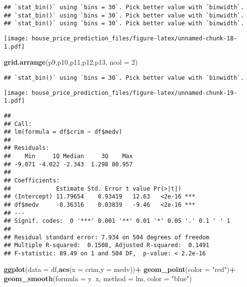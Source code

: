 \documentclass[
]{article}
\newenvironment{Shaded}{\begin{snugshade}}{\end{snugshade}}
\newcommand{\DataTypeTok}[1]{\textcolor[rgb]{0.13,0.29,0.53}{#1}}
\newcommand{\DecValTok}[1]{\textcolor[rgb]{0.00,0.00,0.81}{#1}}
\newcommand{\KeywordTok}[1]{\textcolor[rgb]{0.13,0.29,0.53}{\textbf{#1}}}
\newcommand{\NormalTok}[1]{#1}
\newcommand{\OperatorTok}[1]{\textcolor[rgb]{0.81,0.36,0.00}{\textbf{#1}}}
\newcommand{\StringTok}[1]{\textcolor[rgb]{0.31,0.60,0.02}{#1}}
\begin{document}
\begin{verbatim}
## `stat_bin()` using `bins = 30`. Pick better value with `binwidth`.
## `stat_bin()` using `bins = 30`. Pick better value with `binwidth`.
## `stat_bin()` using `bins = 30`. Pick better value with `binwidth`.
\end{verbatim}

\texttt{[image: house\_price\_prediction\_files/figure-latex/unnamed-chunk-18-1.pdf]}

\begin{Shaded}
\begin{Highlighting}[]
\KeywordTok{grid.arrange}\NormalTok{(p9,p10,p11,p12,p13, }\DataTypeTok{ncol =} \DecValTok{2}\NormalTok{)}
\end{Highlighting}
\end{Shaded}

\begin{verbatim}
## `stat_bin()` using `bins = 30`. Pick better value with `binwidth`.
\end{verbatim}

\texttt{[image: house\_price\_prediction\_files/figure-latex/unnamed-chunk-19-1.pdf]}

\begin{Shaded}
\end{Shaded}

\begin{verbatim}
## 
## Call:
## lm(formula = df$crim ~ df$medv)
## 
## Residuals:
##    Min     1Q Median     3Q    Max 
## -9.071 -4.022 -2.343  1.298 80.957 
## 
## Coefficients:
##             Estimate Std. Error t value Pr(>|t|)    
## (Intercept) 11.79654    0.93419   12.63   <2e-16 ***
## df$medv     -0.36316    0.03839   -9.46   <2e-16 ***
## ---
## Signif. codes:  0 '***' 0.001 '**' 0.01 '*' 0.05 '.' 0.1 ' ' 1
## 
## Residual standard error: 7.934 on 504 degrees of freedom
## Multiple R-squared:  0.1508, Adjusted R-squared:  0.1491 
## F-statistic: 89.49 on 1 and 504 DF,  p-value: < 2.2e-16
\end{verbatim}

\begin{Shaded}
\begin{Highlighting}[]
\KeywordTok{ggplot}\NormalTok{(}\DataTypeTok{data =}\NormalTok{ df,}\KeywordTok{aes}\NormalTok{(}\DataTypeTok{x =}\NormalTok{ crim,}\DataTypeTok{y =}\NormalTok{ medv))}\OperatorTok{+}
\StringTok{  }\KeywordTok{geom_point}\NormalTok{(}\DataTypeTok{color =} \StringTok{"red"}\NormalTok{)}\OperatorTok{+}
\StringTok{  }\KeywordTok{geom_smooth}\NormalTok{(}\DataTypeTok{formula =}\NormalTok{ y}\OperatorTok{~}\NormalTok{x, }\DataTypeTok{method =}\NormalTok{ lm, }\DataTypeTok{color =} \StringTok{"blue"}\NormalTok{)}
\end{Highlighting}
\end{Shaded}
\end{document}
